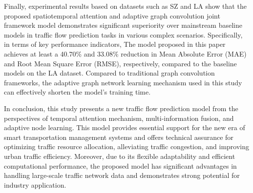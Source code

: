 \begin{abstract*}
Finally, experimental results based on datasets such as SZ and LA show that the proposed spatiotemporal attention and adaptive graph convolution joint framework model demonstrates significant superiority over mainstream baseline models in traffic flow prediction tasks in various complex scenarios. Specifically, in terms of key performance indicators, The model proposed in this paper achieves at least a 40.70\% and 33.08\% reduction in Mean Absolute Error (MAE) and Root Mean Square Error (RMSE), respectively, compared to the baseline models on the LA dataset. Compared to traditional graph convolution frameworks, the adaptive graph network learning mechanism used in this study can effectively shorten the model's training time.

In conclusion, this study presents a new traffic flow prediction model from the perspectives of temporal attention mechanism, multi-information fusion, and adaptive node learning. This model provides essential support for the new era of smart transportation management systems and offers technical assurance for optimizing traffic resource allocation, alleviating traffic congestion, and improving urban traffic efficiency. Moreover, due to its flexible adaptability and efficient computational performance, the proposed model has significant advantages in handling large-scale traffic network data and demonstrates strong potential for industry application.
\end{abstract*}